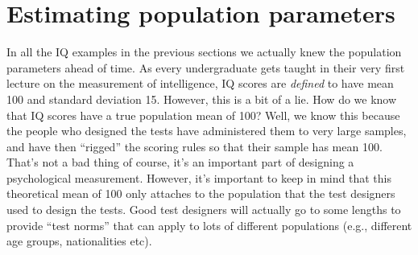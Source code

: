 \section{Estimating population parameters~\label{sec:pointestimates}}

In all the IQ examples in the previous sections we actually knew the population parameters ahead of time. As every undergraduate gets taught in their very first lecture on the measurement of intelligence, IQ scores are {\it defined} to have mean 100 and standard deviation 15. However, this is a bit of a lie. How do we know that IQ scores have a true population mean of 100? Well, we know this because the people who designed the tests have administered them to very large samples, and have then ``rigged'' the scoring rules so that their sample has mean 100. That's not a bad thing of course, it's an important part of designing a psychological measurement. However, it's important to keep in mind that this theoretical mean of 100 only attaches to the population that the test designers used to design the tests. Good test designers will actually go to some lengths to provide ``test norms'' that can apply to lots of different populations (e.g., different age groups, nationalities etc). 

